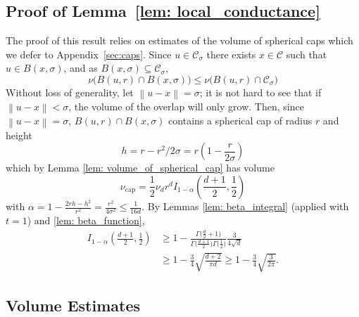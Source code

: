 \documentclass[11pt,twoside]{article}
\theoremstyle{definition}
\newcommand{\norm}[1]{\left\lVert#1\right\rVert}
\newcommand{\1}{\mathbbm{1}}
\newcommand{\Cset}{\mathcal{C}}
\newcommand{\Csig}{\Cset_{\sigma}}
\newcommand{\pprspace}{{\sc PPR~}}
\begin{document}
\subsection{Proof of Lemma~\ref{lem: local_conductance}}
The proof of this result relies on estimates of the volume of spherical caps which we defer to Appendix~\ref{sec:caps}.
	Since $u \in \Csig$ there exists $x \in \Cset$ such that $u \in B(x, \sigma)$, and as $B(x,\sigma) \subseteq \Csig$,
	\begin{equation*}
	\nu\bigl(B(u, r) \cap B(x, \sigma)\bigr) \leq \nu\bigl(B(u, r) \cap \Csig \bigr)
	\end{equation*}
	Without loss of generality, let $\norm{u - x} = \sigma$; it is not hard to see that if $\norm{u - x} < \sigma$, the volume of the overlap will only grow. Then, since $\norm{u  - x} = \sigma$, $B(u, r) \cap B(x, \sigma)$ contains a spherical cap of radius $r$ and height
	\begin{equation*}
	h = r - r^2/2\sigma = r \left( 1 - \frac{r}{2 \sigma} \right)
	\end{equation*}	
	which by Lemma \ref{lem: volume_of_spherical_cap} has volume
	\begin{equation*}
	\nu_{\text{cap}} = \frac{1}{2} \nu_d r^d I_{1 - \alpha}\left( \frac{d + 1}{2}  ,\frac{1}{2}\right)
	\end{equation*}
	with $\alpha = 1 - \frac{2rh - h^2}{r^2} = \frac{r^2}{4 \sigma^2} \leq \frac{1}{16d}$. 
	By Lemmas \ref{lem: beta_integral} (applied with $t = 1$) and \ref{lem: beta_function},
	\begin{align*}
	I_{1 - \alpha}\left( \frac{d + 1}{2}  ,\frac{1}{2}\right) & \geq 1 - \frac{\Gamma\bigl(\frac{d}{2}+ 1\bigr)}{\Gamma\bigl(\frac{d + 1}{2}\bigr) \Gamma\bigl(\frac{1}{2}\bigr)} \frac{3}{4\sqrt{d}} \\
	& \geq 1 - \frac{3}{4}\sqrt{\frac{d+2}{\pi d}} \geq 1 - \frac{3}{4}\sqrt{\frac{3}{2 \pi}}.
	\end{align*}


\subsection{Volume Estimates}
\label{sec: volume_estimates}
%
\end{document}
